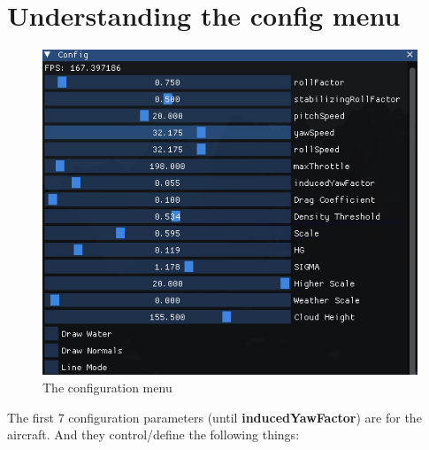 \section{Understanding the config menu}

\begin{figure}[H]
	\centering
	\includegraphics[width=1.0\textwidth,height=0.5\textheight,frame]{images/figure3.png}
	\caption{The configuration menu}
	\label{fig:config_menu}
\end{figure}

The first 7 configuration parameters (until \textbf{inducedYawFactor}) are for the aircraft. And they control/define the following things:


